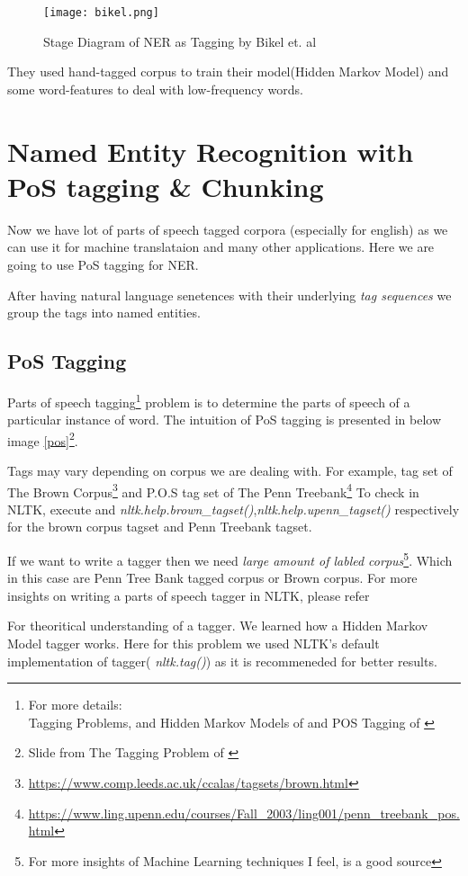 \documentclass[12pt]{report}
\begin{document}
\begin{figure}[htp]
\centering
\texttt{[image: bikel.png]}
\caption{Stage Diagram of NER as Tagging by Bikel et. al}
\label{NERasT}
\end{figure}

They used hand-tagged corpus to train their model(Hidden Markov Model\cite{hmm}) and some
 word-features to deal with low-frequency words. 
 
\section{Named Entity Recognition with PoS tagging \& Chunking}
\par Now we have lot of parts of speech tagged corpora (especially for english) as we can
 use it for machine translataion and many other applications. Here we are going to use 
 PoS tagging for NER. \par After having natural language senetences with their underlying \textit{
 tag sequences} we group the tags into named entities.

\subsection{PoS Tagging}
\par Parts of speech tagging\footnote{For more details:\\Tagging Problems, and Hidden Markov Models of \cite{mc} and POS Tagging of \cite{SNLP}} problem is to determine the parts of speech of a particular
instance of word. The intuition of PoS tagging is presented in below image \ref{pos}\footnote{Slide from
 The Tagging Problem of \cite{mc}}.
\par Tags may vary depending on corpus we are dealing with. For example, tag set of The Brown Corpus\footnote{\url{https://www.comp.leeds.ac.uk/ccalas/tagsets/brown.html}} and P.O.S tag set of The Penn Treebank\footnote{\url{https://www.ling.upenn.edu/courses/Fall_2003/ling001/penn_treebank_pos.html}}
To check in NLTK, execute and \textit{nltk.help.brown\_tagset()},\textit{nltk.help.upenn\_tagset()} respectively for the brown corpus tagset and Penn Treebank tagset.
\par If we want to write a tagger then we need \textit{large amount of labled corpus}\footnote{For more insights of 
Machine Learning techniques I feel, \cite{Videos} is a good source}. Which in this case
 are Penn Tree Bank tagged corpus or Brown corpus.
For more insights on writing a parts of speech tagger in NLTK, please refer\cite{tag}
\par For theoritical understanding of a tagger. We learned how a Hidden Markov Model tagger\cite{hmm}
 works. Here for this problem we used NLTK's default implementation of tagger(\textit{
 nltk.tag()}) as it is recommeneded for better results.
\end{document}
